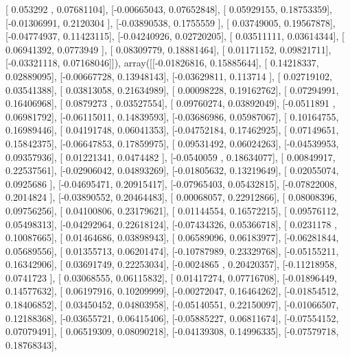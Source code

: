 \documentclass{article}
\begin{document}
       [ 0.053292  ,  0.07681104],
       [-0.00665043,  0.07652848],
       [ 0.05929155,  0.18753359],
       [-0.01306991,  0.2120304 ],
       [-0.03890538,  0.1755559 ],
       [ 0.03749005,  0.19567878],
       [-0.04774937,  0.11423115],
       [-0.04240926,  0.02720205],
       [ 0.03511111,  0.03614344],
       [ 0.06941392,  0.0773949 ],
       [ 0.08309779,  0.18881464],
       [ 0.01171152,  0.09821711],
       [-0.03321118,  0.07168046]]), array([[-0.01826816,  0.15885644],
       [ 0.14218337,  0.02889095],
       [-0.00667728,  0.13948143],
       [-0.03629811,  0.113714  ],
       [ 0.02719102,  0.03541388],
       [ 0.03813058,  0.21634989],
       [ 0.00098228,  0.19162762],
       [ 0.07294991,  0.16406968],
       [ 0.0879273 ,  0.03527554],
       [ 0.09760274,  0.03892049],
       [-0.0511891 ,  0.06981792],
       [-0.06115011,  0.14839593],
       [-0.03686986,  0.05987067],
       [ 0.10164755,  0.16989446],
       [ 0.04191748,  0.06041353],
       [-0.04752184,  0.17462925],
       [ 0.07149651,  0.15842375],
       [-0.06647853,  0.17859975],
       [ 0.09531492,  0.06024263],
       [-0.04539953,  0.09357936],
       [ 0.01221341,  0.0474482 ],
       [-0.0540059 ,  0.18634077],
       [ 0.00849917,  0.22537561],
       [-0.02906042,  0.04893269],
       [-0.01805632,  0.13219649],
       [ 0.02055074,  0.0925686 ],
       [-0.04695471,  0.20915417],
       [-0.07965403,  0.05432815],
       [-0.07822008,  0.2014824 ],
       [-0.03890552,  0.20464483],
       [ 0.00068057,  0.22912866],
       [ 0.08008396,  0.09756256],
       [ 0.04100806,  0.23179621],
       [ 0.01144554,  0.16572215],
       [ 0.09576112,  0.05498313],
       [-0.04292964,  0.22618124],
       [-0.07434326,  0.05366718],
       [ 0.0231178 ,  0.10087665],
       [ 0.01464686,  0.03898943],
       [ 0.06589096,  0.06183977],
       [-0.06281844,  0.05689556],
       [ 0.01355713,  0.06201474],
       [-0.10787989,  0.23329768],
       [-0.05155211,  0.16342906],
       [ 0.03691749,  0.22253034],
       [-0.0024865 ,  0.20420357],
       [-0.11218958,  0.0741723 ],
       [ 0.03068555,  0.06115832],
       [ 0.01417274,  0.07716708],
       [-0.01896449,  0.14577632],
       [ 0.06197916,  0.10209999],
       [-0.00272047,  0.16464262],
       [-0.01854512,  0.18406852],
       [ 0.03450452,  0.04803958],
       [-0.05140551,  0.22150097],
       [-0.01066507,  0.12188368],
       [-0.03655721,  0.06415406],
       [-0.05885227,  0.06811674],
       [-0.07554152,  0.07079491],
       [ 0.06519309,  0.08090218],
       [-0.04139308,  0.14996335],
       [-0.07579718,  0.18768343],
\end{document}
